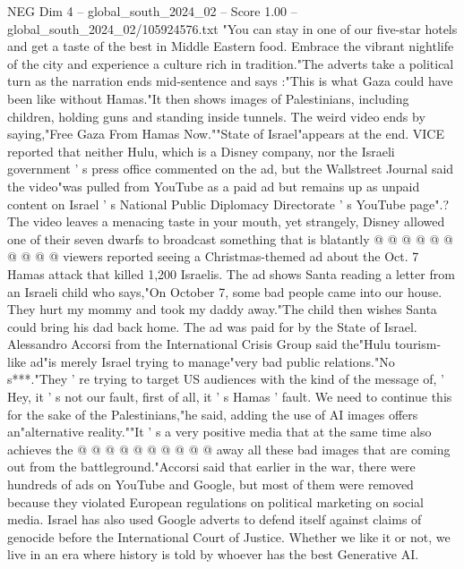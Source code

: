 \begin{textsample}{NEG Dim 4 – global\_south\_2024\_02 – Score 1.00 – global\_south\_2024\_02/105924576.txt}  \label{ex:f4_neg_389}
"You can stay in one of our five-star hotels and get a taste of the best in Middle Eastern food.
Embrace the vibrant nightlife of the city and experience a culture rich in tradition."The adverts take a political turn as the narration ends mid-sentence and says :"This is what Gaza could have been like without Hamas."It then shows images of Palestinians, including children, holding guns and standing inside tunnels.
The weird video ends by saying,"Free Gaza From Hamas Now.""State of Israel"appears at the end.
VICE reported that neither Hulu, which is a Disney company, nor the Israeli government ' s press office commented on the ad, but the Wallstreet Journal said the video"was pulled from YouTube as a paid ad but remains up as unpaid content on Israel ' s National Public Diplomacy Directorate ' s YouTube page".?
The video leaves a menacing taste in your mouth, yet strangely, Disney allowed one of their seven dwarfs to broadcast something that is blatantly @ @ @ @ @ @ @ @ @ @ viewers reported seeing a Christmas-themed ad about the Oct. 7 Hamas attack that killed 1,200 Israelis.
The ad shows Santa reading a letter from an Israeli child who says,"On October 7, some bad people came into our house.
They hurt my mommy and took my daddy away."The child then wishes Santa could bring his dad back home.
The ad was paid for by the State of Israel.
Alessandro Accorsi from the International Crisis Group said the"Hulu tourism-like ad"is merely Israel trying to manage"very bad public relations."No s***."They ' re trying to target US audiences with the kind of the message of, ' Hey, it ' s not our fault, first of all, it ' s Hamas ' fault.
We need to continue this for the sake of the Palestinians,"he said, adding the use of AI images offers an"alternative reality.""It ' s a very positive media that at the same time also achieves the @ @ @ @ @ @ @ @ @ @ away all these bad images that are coming out from the battleground."Accorsi said that earlier in the war, there were hundreds of ads on YouTube and Google, but most of them were removed because they violated European regulations on political marketing on social media.
Israel has also used Google adverts to defend itself against claims of genocide before the International Court of Justice.
Whether we like it or not, we live in an era where history is told by whoever has the best Generative AI.

\end{textsample}

